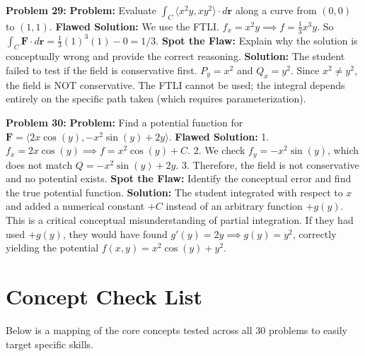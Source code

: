 \documentclass[12pt]{article}
\begin{document}
\textbf{Problem 29:} 
\textbf{Problem:} Evaluate $\int_C \langle x^2y, xy^2 \rangle \cdot d\mathbf{r}$ along a curve from $(0,0)$ to $(1,1)$. 
\textbf{Flawed Solution:} We use the FTLI. $f_x = x^2y \implies f = \frac{1}{3}x^3y$. So $\int_C \mathbf{F} \cdot d\mathbf{r} = \frac{1}{3}(1)^3(1) - 0 = 1/3$.
\textbf{Spot the Flaw:} Explain why the solution is conceptually wrong and provide the correct reasoning.
\textbf{Solution:} The student failed to test if the field is conservative first. $P_y = x^2$ and $Q_x = y^2$. Since $x^2 \neq y^2$, the field is NOT conservative. The FTLI cannot be used; the integral depends entirely on the specific path taken (which requires parameterization).

\textbf{Problem 30:} 
\textbf{Problem:} Find a potential function for $\mathbf{F} = \langle 2x \cos(y), -x^2 \sin(y) + 2y \rangle$. 
\textbf{Flawed Solution:} 1. $f_x = 2x \cos(y) \implies f = x^2 \cos(y) + C$. 2. We check $f_y = -x^2 \sin(y)$, which does not match $Q = -x^2 \sin(y) + 2y$. 3. Therefore, the field is not conservative and no potential exists.
\textbf{Spot the Flaw:} Identify the conceptual error and find the true potential function.
\textbf{Solution:} The student integrated with respect to $x$ and added a numerical constant $+C$ instead of an arbitrary function $+g(y)$. This is a critical conceptual misunderstanding of partial integration. If they had used $+g(y)$, they would have found $g'(y) = 2y \implies g(y) = y^2$, correctly yielding the potential $f(x,y) = x^2 \cos(y) + y^2$.

\newpage

\section*{Concept Check List}
Below is a mapping of the core concepts tested across all 30 problems to easily target specific skills.
\end{document}
